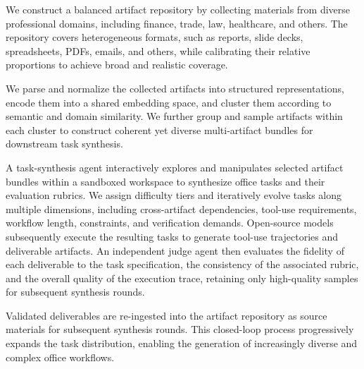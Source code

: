 We construct a balanced artifact repository by collecting materials from diverse professional domains, including finance, trade, law, healthcare, and others. The repository covers heterogeneous formats, such as reports, slide decks, spreadsheets, PDFs, emails, and others, while calibrating their relative proportions to achieve broad and realistic coverage.

We parse and normalize the collected artifacts into structured representations, encode them into a shared embedding space, and cluster them according to semantic and domain similarity. We further group and sample artifacts within each cluster to construct coherent yet diverse multi-artifact bundles for downstream task synthesis.

A task-synthesis agent interactively explores and manipulates selected artifact bundles within a sandboxed workspace to synthesize office tasks and their evaluation rubrics. We assign difficulty tiers and iteratively evolve tasks along multiple dimensions, including cross-artifact dependencies, tool-use requirements, workflow length, constraints, and verification demands. Open-source models subsequently execute the resulting tasks to generate tool-use trajectories and deliverable artifacts. An independent judge agent then evaluates the fidelity of each deliverable to the task specification, the consistency of the associated rubric, and the overall quality of the execution trace, retaining only high-quality samples for subsequent synthesis rounds.


Validated deliverables are re-ingested into the artifact repository as source materials for subsequent synthesis rounds. This closed-loop process progressively expands the task distribution, enabling the generation of increasingly diverse and complex office workflows.


